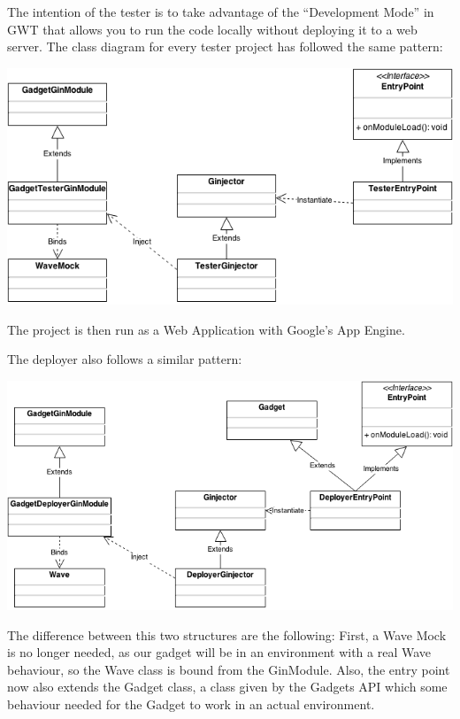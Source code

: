 The intention of the tester is to take advantage of the ``Development Mode'' in GWT that allows you to run the code locally without deploying it to a web server. The class diagram for every tester project has followed the same pattern:

\begin{center}
\includegraphics[keepaspectratio, scale=0.6]{Media/Diagrams/Gadget/Tester.png}
\end{center}

The project is then run as a Web Application with Google's App Engine.

The deployer also follows a similar pattern:

\begin{center}
\includegraphics[keepaspectratio, scale=0.5]{Media/Diagrams/Gadget/Deployer.png}
\end{center}

The difference between this two structures are the following: First, a Wave Mock is no longer needed, as our gadget will be in an environment with a real Wave behaviour, so the Wave class is bound from the GinModule. Also, the entry point now also extends the Gadget class, a class given by the Gadgets API which some behaviour needed for the Gadget to work in an actual environment.







